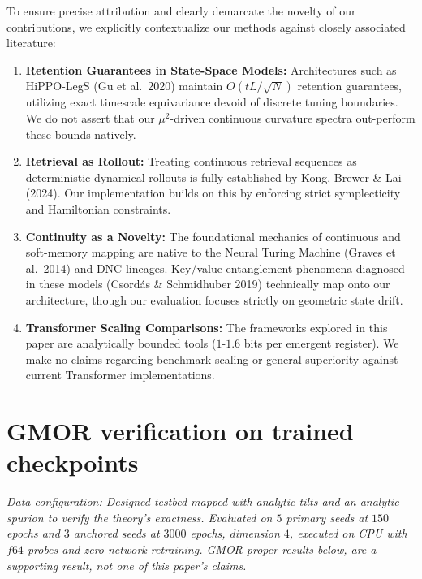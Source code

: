 \documentclass{article}
\begin{document}
To ensure precise attribution and clearly demarcate the novelty of our contributions, we explicitly contextualize our methods against closely associated literature:

\begin{enumerate}
    \item \textbf{Retention Guarantees in State-Space Models:} Architectures such as HiPPO-LegS (Gu et al.\ 2020) maintain $O(tL/\sqrt N)$ retention guarantees, utilizing exact timescale equivariance devoid of discrete tuning boundaries. We do not assert that our $\mu^2$-driven continuous curvature spectra out-perform these bounds natively.
    \item \textbf{Retrieval as Rollout:} Treating continuous retrieval sequences as deterministic dynamical rollouts is fully established by Kong, Brewer \& Lai (2024). Our implementation builds on this by enforcing strict symplecticity and Hamiltonian constraints.
    \item \textbf{Continuity as a Novelty:} The foundational mechanics of continuous and soft-memory mapping are native to the Neural Turing Machine (Graves et al.\ 2014) and DNC lineages. Key/value entanglement phenomena diagnosed in these models (Csord\'as \& Schmidhuber 2019) technically map onto our architecture, though our evaluation focuses strictly on geometric state drift.
    \item \textbf{Transformer Scaling Comparisons:} The frameworks explored in this paper are analytically bounded tools ($1$-$1.6$ bits per emergent register). We make no claims regarding benchmark scaling or general superiority against current Transformer implementations.
\end{enumerate}

\section{GMOR verification on trained checkpoints}\label{app:gmor}

\emph{Data configuration: Designed testbed mapped with analytic tilts and an analytic spurion to verify the theory's exactness. Evaluated on $5$ primary seeds at $150$ epochs and $3$ anchored seeds at $3000$ epochs, dimension $4$, executed on CPU with $f64$ probes and zero network retraining. GMOR-proper results below, are a supporting result, not one of this paper's claims.}
\end{document}
